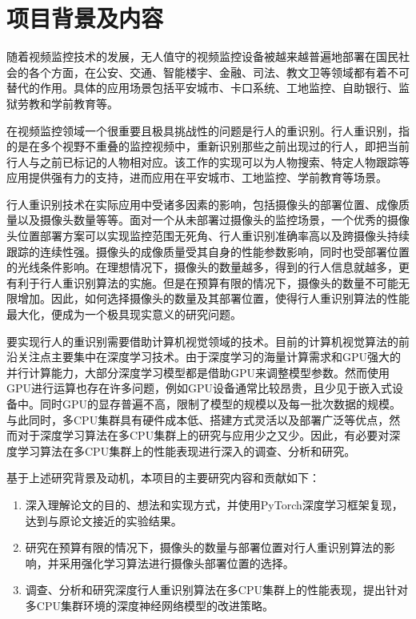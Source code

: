 \section{项目背景及内容}
随着视频监控技术的发展，无人值守的视频监控设备被越来越普遍地部署在国民社会的各个方面，在公安、交通、智能楼宇、金融、司法、教文卫等领域都有着不可替代的作用。具体的应用场景包括平安城市、卡口系统、工地监控、自助银行、监狱劳教和学前教育等。

在视频监控领域一个很重要且极具挑战性的问题是行人的重识别。行人重识别，指的是在多个视野不重叠的监控视频中，重新识别那些之前出现过的行人，即把当前行人与之前已标记的人物相对应。该工作的实现可以为人物搜索、特定人物跟踪等应用提供强有力的支持，进而应用在平安城市、工地监控、学前教育等场景。

行人重识别技术在实际应用中受诸多因素的影响，包括摄像头的部署位置、成像质量以及摄像头数量等等。面对一个从未部署过摄像头的监控场景，一个优秀的摄像头位置部署方案可以实现监控范围无死角、行人重识别准确率高以及跨摄像头持续跟踪的连续性强。摄像头的成像质量受其自身的性能参数影响，同时也受部署位置的光线条件影响。在理想情况下，摄像头的数量越多，得到的行人信息就越多，更有利于行人重识别算法的实施。但是在预算有限的情况下，摄像头的数量不可能无限增加。因此，如何选择摄像头的数量及其部署位置，使得行人重识别算法的性能最大化，便成为一个极具现实意义的研究问题。

要实现行人的重识别需要借助计算机视觉领域的技术。目前的计算机视觉算法的前沿关注点主要集中在深度学习技术。由于深度学习的海量计算需求和GPU强大的并行计算能力，大部分深度学习模型都是借助GPU来调整模型参数。然而使用GPU进行运算也存在许多问题，例如GPU设备通常比较昂贵，且少见于嵌入式设备中。同时GPU的显存普遍不高，限制了模型的规模以及每一批次数据的规模。与此同时，多CPU集群具有硬件成本低、搭建方式灵活以及部署广泛等优点，然而对于深度学习算法在多CPU集群上的研究与应用少之又少。因此，有必要对深度学习算法在多CPU集群上的性能表现进行深入的调查、分析和研究。

基于上述研究背景及动机，本项目的主要研究内容和贡献如下：

\begin{enumerate}
\item 深入理解论文\cite{sun2017beyond}的目的、想法和实现方式，并使用PyTorch深度学习框架复现，达到与原论文接近的实验结果。
\item 研究在预算有限的情况下，摄像头的数量与部署位置对行人重识别算法的影响，并采用强化学习算法进行摄像头部署位置的选择。
\item 调查、分析和研究深度行人重识别算法在多CPU集群上的性能表现，提出针对多CPU集群环境的深度神经网络模型的改进策略。
\end{enumerate}

